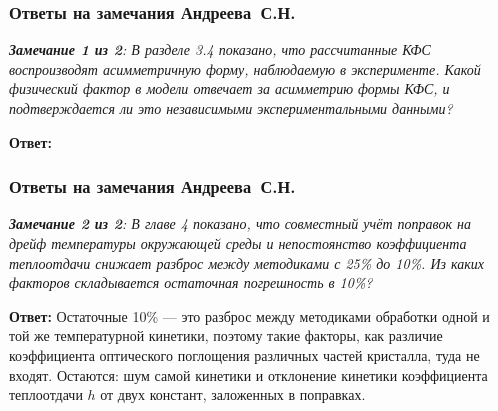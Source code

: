 \begin{frame}
	\frametitle{Ответы на замечания Андреева~С.Н.}
	\small{\textit{\textbf{Замечание 1 из 2}: В разделе 3.4 показано, что рассчитанные КФС воспроизводят асимметричную форму, наблюдаемую в эксперименте. Какой физический фактор в модели отвечает за асимметрию формы КФС, и подтверждается ли это независимыми экспериментальными данными?}}
	
	\hfill
	
	\textbf{Ответ:} 
	
	
\end{frame}

\begin{frame}
	\frametitle{Ответы на замечания Андреева~С.Н.}
	\small{\textit{\textbf{Замечание 2 из 2}: В главе 4 показано, что совместный учёт поправок на дрейф температуры окружающей среды и непостоянство коэффициента теплоотдачи снижает разброс между методиками с 25\% до 10\%. Из каких факторов складывается остаточная погрешность в 10\%?}}
	
	\hfill
	
	\textbf{Ответ:} Остаточные 10\% — это разброс между методиками обработки одной и той же температурной кинетики, поэтому такие факторы, как различие коэффициента оптического поглощения различных частей кристалла, туда не входят. Остаются: шум самой кинетики и отклонение кинетики коэффициента теплоотдачи $h$
	от двух констант, заложенных в поправках.
\end{frame}